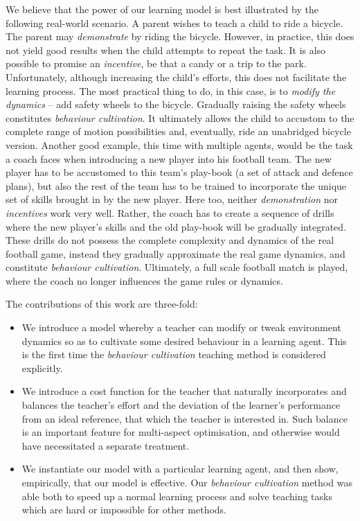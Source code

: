 We believe that the power of our learning model is best illustrated by
the following real-world scenario. A parent wishes to teach a child to
ride a bicycle. The parent may {\em demonstrate} by riding the
bicycle. However, in practice, this does not yield good results when
the child attempts to repeat the task. It is also possible to promise
an {\em incentive}, be that a candy or a trip to the
park. Unfortunately, although increasing the child's efforts, this
does not facilitate the learning process. The most practical thing to
do, in this case, is to {\em modify the dynamics} -- add safety wheels
to the bicycle. Gradually raising the safety wheels constitutes {\em
  behaviour cultivation}. It ultimately allows the child to accustom
to the complete range of motion possibilities and, eventually, ride an
unabridged bicycle version. Another good example, this time with
multiple agents, would be the task a coach faces when introducing a
new player into his football team. The new player has to be accustomed
to this team's play-book (a set of attack and defence plans), but also
the rest of the  team has to be trained to incorporate the unique set of
skills brought in by the new player. Here too, neither {\em
  demonstration} nor {\em incentives} work very well. Rather, the
coach has to create a sequence of drills where the new player's skills
and the old play-book will be gradually integrated. These drills do
not possess the complete complexity and dynamics of the real football
game, instead they gradually approximate the real game dynamics, and
constitute {\em behaviour cultivation}. Ultimately, a full scale
football match is played, where the coach no longer influences the
game rules or dynamics.

The contributions of this work are three-fold:
\begin{itemize}
\item We introduce a model whereby a teacher can modify or tweak
  environment dynamics so as to cultivate some desired behaviour in a
  learning agent. This is the first time the {\em behaviour
    cultivation} teaching method is considered explicitly.
\item We introduce a cost function for the teacher that naturally
  incorporates and balances the teacher's effort and the deviation of
  the learner's performance from an ideal reference, that which the
  teacher is interested in. Such balance is an important feature for
  multi-aspect optimisation, and otherwise would have necessitated a
  separate treatment.
\item We instantiate our model with a particular learning agent, and
  then show, empirically, that our model is effective. Our {\em
    behaviour cultivation} method was able both to speed up a normal
  learning process and solve teaching tasks which are hard or
  impossible for other methods.
\end{itemize}

